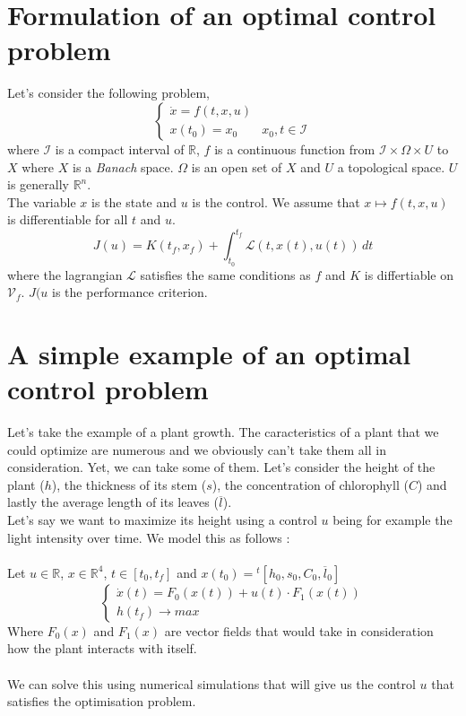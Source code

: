 \documentclass{tudelft-report}
\begin{document}
\section*{Formulation of an optimal control problem}\noindent
Let's consider the following problem, 
$$\begin{cases}
 \dot x = f(t,x,u)\\
 x(t_0) = x_0 & x_0,t \in \mathcal{I}
\end{cases}$$
where $\mathcal{I}$ is a compact interval of $\mathbb{R}$, $f$ is a continuous function from $\mathcal{I}\times\Omega\times U$ to $X$ where $X$ is a \textit{Banach} space. $\Omega$ is an open set of $X$ and $U$ a topological space. $U$ is generally $\mathbb{R}^n$.\\
The variable $x$ is the state and $u$ is the control. We assume that $x\longmapsto f(t,x,u)$ is differentiable for all $t$ and $u$.
$$J(u) = K(t_f,x_f) + \int_{t_0}^{t_f} \mathcal{L}(t,x(t), u(t))\,dt$$
where the lagrangian $\mathcal{L}$ satisfies the same conditions as $f$ and $K$ is differtiable on $\mathcal{V}_f$. $J(u$ is the performance criterion.
\section*{A simple example of an optimal control problem}\noindent
Let's take the example of a plant growth. The caracteristics of a plant that we could optimize are numerous and we obviously can't take them all in consideration. Yet, we can take some of them. Let's consider the height of the plant ($h$), the thickness of its stem ($s$), the concentration of chlorophyll ($C$) and lastly the average length of its leaves ($\overline{l}$).\\
Let's say we want to maximize its height using a control $u$ being for example the light intensity over time. We model this as follows : \\\\
Let $u\in\mathbb{R}$, $x\in \mathbb{R}^4$, $t\in [t_0, t_f]$ and $x(t_0) = {}^t[h_0, s_0, C_0, \overline{l}_0]$
\begin{equation*}
\begin{cases}\tag{\ast}\label{eq:exempleocp}
   \dot x(t) = F_0(x(t)) + u(t)\cdot F_1(x(t))\\
   h(t_f) \longrightarrow max
  \end{cases}
\end{equation*}\noindent
Where $F_0(x)$ and $F_1(x)$ are vector fields that would take in consideration how the plant interacts with itself.\\ \\
We can solve this using numerical simulations that will give us the control $u$ that satisfies the optimisation problem.
\end{document}
